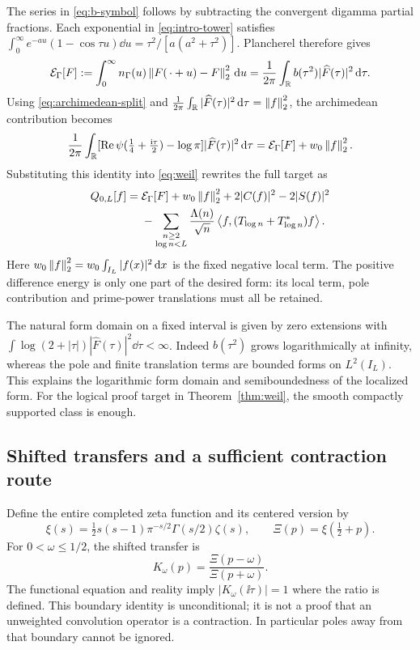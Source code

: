 The series in \eqref{eq:b-symbol} follows by subtracting the convergent digamma partial
fractions. Each exponential in \eqref{eq:intro-tower} satisfies
$\int_0^\infty e^{-a u}(1-\cos\tau u)\dd u
=\tau^2/[a(a^2+\tau^2)]$. Plancherel therefore gives
\begin{equation}\label{eq:kinetic}
 \mathcal E_\Gamma[F]
 :=\int_0^\infty n_\Gamma(u)\left\lVert F(\,\cdot+u)-F\right\rVert_2^2\,\mathrm d u
 =\frac1{2\pi}\int_\mathbb R b(\tau^2)|\widehat F(\tau)|^2\,\mathrm d\tau.
\end{equation}
Using \eqref{eq:archimedean-split} and
$\frac1{2\pi}\int_\mathbb R|\widehat F(\tau)|^2\,\mathrm d\tau=\left\lVert f\right\rVert_2^2$,
the archimedean contribution becomes
\begin{equation}\label{eq:archimedean-energy}
 \frac1{2\pi}\int_\mathbb R
 [\operatorname{Re}\psi(\tfrac14+\tfrac{\mathrm i\tau}2)-\log\pi]
 |\widehat F(\tau)|^2\,\mathrm d\tau
 =\mathcal E_\Gamma[F]+w_0\left\lVert f\right\rVert_2^2.
\end{equation}
Substituting this identity into \eqref{eq:weil} rewrites the full target as
\begin{align}\label{eq:weil-energy}
 Q_{0,L}[f]={}&\mathcal E_\Gamma[F]+w_0\left\lVert f\right\rVert_2^2
 +2|C(f)|^2-2|S(f)|^2\notag\\
 &-\sum_{\substack{n\geq2\\\log n<L}}
 \frac{\Lambda(n)}{\sqrt n}\left\langle f,(T_{\log n}+T_{\log n}^*)f\right\rangle.
\end{align}
Here $w_0\left\lVert f\right\rVert_2^2=w_0\int_{I_L}|f(x)|^2\,\mathrm d x$ is the fixed
negative local term. The positive difference energy is only one part of
the desired form: its local term, pole contribution and prime-power
translations must all be retained.

The natural form domain on a fixed interval is given by zero extensions
with $\int\log(2+|\tau|)|\widehat F(\tau)|^2\dd\tau<\infty$.
Indeed $b(\tau^2)$ grows logarithmically at infinity, whereas the pole
and finite translation terms are bounded forms on $L^2(I_L)$. This
explains the logarithmic form domain and semiboundedness of the
localized form. For the logical proof target in Theorem~\ref{thm:weil},
the smooth compactly supported class is enough.

\subsection{Shifted transfers and a sufficient contraction route}

Define the entire completed zeta function and its centered version by
\begin{equation}
 \xi(s)=\tfrac12s(s-1)\pi^{-s/2}\Gamma(s/2)\zeta(s),
 \qquad \Xi(p)=\xi(\tfrac12+p).
\end{equation}
For $0<\omega\leq1/2$, the shifted transfer is
\begin{equation}\label{eq:transfer}
 K_\omega(p)=\frac{\Xi(p-\omega)}{\Xi(p+\omega)}.
\end{equation}
The functional equation and reality imply $|K_\omega(\ii\tau)|=1$
where the ratio is defined. This boundary identity is unconditional;
it is not a proof that an unweighted convolution operator is a
contraction. In particular poles away from that boundary cannot be
ignored.

